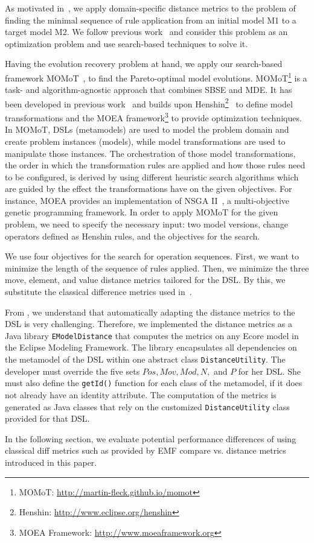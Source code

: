
As motivated in~, we apply domain-specific distance metrics to the problem of finding the minimal sequence of rule application from an initial model M1 to a target model M2. We follow previous work~\cite{KessentiniMWOD17,FadhelKLW12} and consider this problem as an optimization problem and use search-based techniques to solve it.

Having the evolution recovery problem at hand, we apply our search-based framework MOMoT~\cite{FleckTW16}, to find the Pareto-optimal model evolutions.
MOMoT\footnote{
    MOMoT: \url{http://martin-fleck.github.io/momot}
} is a task- and algorithm-agnostic approach that combines SBSE and MDE.
It has been developed in previous work~\cite{FleckTW16} and builds upon Henshin\footnote{
    Henshin: \url{http://www.eclipse.org/henshin}
}~\cite{Arendt10} to define model transformations and the MOEA framework\footnote{
    MOEA Framework: \url{http://www.moeaframework.org}
} to provide optimization techniques.
In MOMoT, DSLs (\ie metamodels) are used to model the problem domain and create problem instances (\ie models), while model transformations are used to manipulate those instances.
The orchestration of those model transformations, \ie the order in which the transformation rules are applied and how those rules need to be configured, is derived by using different heuristic search algorithms which are guided by the effect the transformations have on the given objectives.
For instance, MOEA provides an implementation of NSGA II~\cite{DebAPM02}, a multi-objective genetic programming framework.
In order to apply MOMoT for the given problem, we need to specify the necessary input: two model versions, change operators defined as Henshin rules, and the objectives for the search.

We use four objectives for the search for operation sequences.
First, we want to minimize the length of the sequence of rules applied.
Then, we minimize the three move, element, and value distance metrics tailored for the DSL. By this, we substitute the classical difference metrics used in~\cite{KessentiniMWOD17,FadhelKLW12}. 

From , we understand that automatically adapting the distance metrics to the DSL is very challenging.
Therefore, we implemented the distance metrics as a Java library \texttt{EModelDistance} that computes the metrics on any Ecore model in the Eclipse Modeling Framework.
The library encapsulates all dependencies on the metamodel of the DSL within one abstract class \texttt{DistanceUtility}.
The developer must override the five sets $Pos,Mov,Mod,N,$ and $P$ for her DSL.
She must also define the \texttt{getId()} function for each class of the metamodel, if it does not already have an identity attribute.
The computation of the metrics is generated as Java classes that rely on the customized \texttt{DistanceUtility} class provided for that DSL. 

In the following section, we evaluate potential performance differences of using classical diff metrics such as provided by EMF compare vs. distance metrics introduced in this paper. 